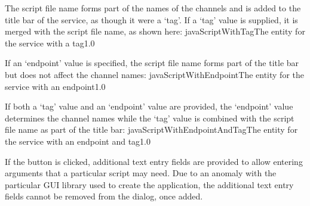 The script file name forms part of the names of the channels and is added to the title bar
of the service, as though it were a `tag'.
\condPage{}
If a `tag' value is supplied, it is merged with the script file name, as shown here:
%
{javaScriptWithTag}{The \emph{\MMMU} entity for the \emph{\JSIO} service with a tag}{1.0}

If an `endpoint' value is specified, the script file name forms part of the title bar but
does not affect the channel names:
%
{javaScriptWithEndpoint}{The \emph{\MMMU} entity for the \emph{\JSIO} service with an
endpoint}{1.0}

If both a `tag' value and an `endpoint' value are provided, the `endpoint' value
determines the channel names while the `tag' value is combined with the script file name
as part of the title bar:
%
{javaScriptWithEndpointAndTag}{The \emph{\MMMU} entity for the \emph{\JSIO} service with
an endpoint and tag}{1.0}

If the  button is clicked, additional text entry fields are
provided to allow entering arguments that a particular script may need.
\openSq{}Due to an anomaly with the particular GUI library used to create the
\emph{\MMMU} application, the additional text entry fields cannot be removed from the
dialog, once added.\closeSq{}
\secondaryEnd
\primaryEnd{}
